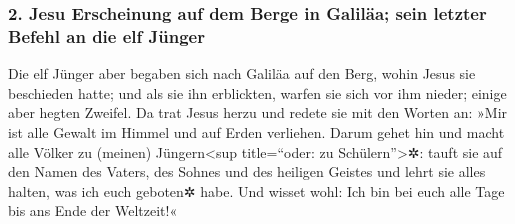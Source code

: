 \hypertarget{jesu-erscheinung-auf-dem-berge-in-galiluxe4a-sein-letzter-befehl-an-die-elf-juxfcnger}{%
\subsubsection{2. Jesu Erscheinung auf dem Berge in Galiläa; sein
letzter Befehl an die elf
Jünger}\label{jesu-erscheinung-auf-dem-berge-in-galiluxe4a-sein-letzter-befehl-an-die-elf-juxfcnger}}

 Die elf Jünger aber begaben sich nach Galiläa auf den
Berg, wohin Jesus sie beschieden hatte;  und als sie ihn
erblickten, warfen sie sich vor ihm nieder; einige aber hegten Zweifel.
 Da trat Jesus herzu und redete sie mit den Worten an:
»Mir ist alle Gewalt im Himmel und auf Erden verliehen. 
Darum gehet hin und macht alle Völker zu (meinen) Jüngern\textless sup
title=``oder: zu Schülern''\textgreater✲: tauft sie auf den Namen des
Vaters, des Sohnes und des heiligen Geistes  und lehrt
sie alles halten, was ich euch geboten✲ habe. Und wisset wohl: Ich bin
bei euch alle Tage bis ans Ende der Weltzeit!«
